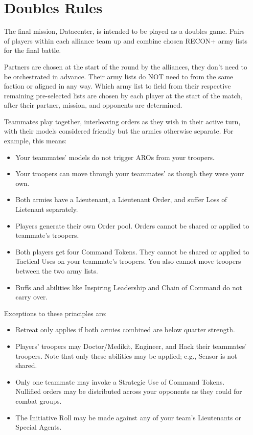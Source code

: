 \clearpage
\chapter{Doubles Rules}

The final mission, Datacenter, is intended to be played as a doubles
game.  Pairs of players within each alliance team up and combine
chosen RECON+ army lists for the final battle.

Partners are chosen at the start of the round by the alliances, they
don't need to be orchestrated in advance.  Their army lists do NOT
need to from the same faction or aligned in any way.  Which army list
to field from their respective remaining pre-selected lists are chosen
by each player at the start of the match, after their partner,
mission, and opponents are determined.

Teammates play together, interleaving orders as they wish in their
active turn, with their models considered friendly but the armies
otherwise separate. For example, this means:

\begin{itemize}
\item Your teammates' models do not trigger AROs from your troopers.
  
\item Your troopers can move through your teammates' as though they
  were your own.
  
\item Both armies have a Lieutenant, a Lieutenant Order, and suffer
  Loss of Lietenant separately.
  
\item Players generate their own Order pool. Orders cannot be shared
  or applied to teammate's troopers.
  
\item Both players get four Command Tokens.  They cannot be shared or
  applied to Tactical Uses on your teammate's troopers.  You also
  cannot move troopers between the two army lists.
  
\item Buffs and abilities like Inspiring Leadership and Chain of
  Command do not carry over.
\end{itemize}

Exceptions to these principles are:

\begin{itemize}
\item Retreat only applies if both armies combined are below quarter
  strength.
\item Players' troopers may Doctor/Medikit, Engineer, and Hack their
  teammates' troopers.  Note that only these abilities may be applied;
  e.g., Sensor is not shared.
\item Only one teammate may invoke a Strategic Use of Command Tokens.
  Nullified orders may be distributed across your opponents as they
  could for combat groups.

\item The Initiative Roll may be made against any of your team's
  Lieutenants or Special Agents.
\end{itemize}
